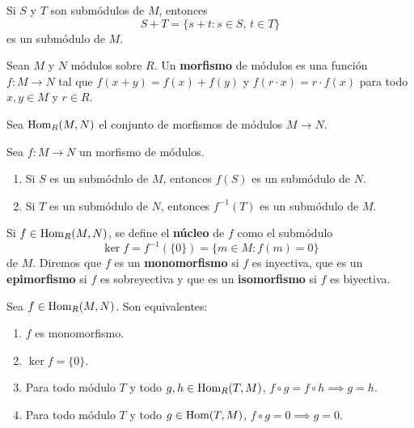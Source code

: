 \begin{exercise}
Si $S$ y $T$ son submódulos de $M$, entonces 
\[
S+T=\{s+t:s\in S,\,t\in T\}
\]
es un submódulo de $M$.
\end{exercise}

\begin{definition}
Sean $M$ y $N$ módulos sobre $R$. 
Un \textbf{morfismo} de módulos es una función $f\colon M\to N$ tal que $f(x+y)=f(x)+f(y)$ y 
$f(r\cdot x)=r\cdot f(x)$ para todo $x,y\in M$ y $r\in R$. 
\end{definition}

Sea $\operatorname{Hom}_R(M,N)$ el conjunto de morfismos de módulos $M\to N$. 

\begin{exercise}
Sea $f\colon M\to N$ un morfismo de módulos. 
\begin{enumerate}
\item Si $S$ es un submódulo de $M$, entonces $f(S)$ es un submódulo de $N$.
\item Si $T$ es un submódulo de $N$, entonces $f^{-1}(T)$ es un submódulo de $M$.
\end{enumerate}
\end{exercise}

Si $f\in\operatorname{Hom}_R(M,N)$, se define el \textbf{núcleo} de $f$ como el submódulo 
\[
\ker f=f^{-1}(\{0\})=\{m\in M:f(m)=0\}
\]
de $M$. Diremos que $f$ es un \textbf{monomorfismo} si $f$ es inyectiva, que
es un \textbf{epimorfismo} si $f$ es sobreyectiva y que es un \textbf{isomorfismo} 
si $f$ es biyectiva. 

\begin{exercise}
Sea $f\in\operatorname{Hom}_R(M,N)$. Son equivalentes:
\begin{enumerate}
\item $f$ es monomorfismo.
\item $\ker f=\{0\}$.
\item Para todo módulo $T$ y todo $g,h\in\operatorname{Hom}_R(T,M)	$, $f\circ g=f\circ h\implies g=h$.
\item Para todo módulo $T$ y todo $g\in\operatorname{Hom}(T,M)$, $f\circ g=0\implies g=0$.
\end{enumerate}
\end{exercise}


